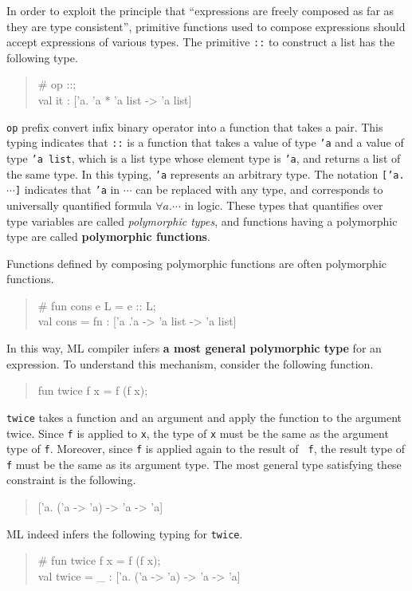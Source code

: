 \documentclass{jbook}
\newenvironment{program}{\begin{tt}\begin{quote}}{\end{quote}\end{tt}}
\begin{document}
	In order to exploit the principle that  ``expressions are freely
composed as far as they are type consistent'', primitive functions used
to compose expressions should accept expressions of various types.
	The primitive {\tt ::} to construct a list has the following type.
\begin{program}
\# op ::;\\
val it : ['a. 'a * 'a list -> 'a list]
\end{program}
	{\tt op} prefix convert infix binary operator into a function
that takes a pair.
	This typing indicates that {\tt ::} is a function that takes a
value of type {\tt 'a} and a value of type {\tt 'a list}, which is a
list type whose element type is {\tt 'a}, and returns a list of the same
type.
	In this typing, {\tt 'a} represents an arbitrary type.
	The notation {\tt ['a.$\cdots$]} indicates that {\tt 'a} in
$\cdots$ can be replaced with any type, and corresponds to universally
quantified formula $\forall a.\cdots$ in logic.
	These types that quantifies over type variables are called {\em
polymorphic types}, and functions having a polymorphic type are called 
{\bf polymorphic functions}.
	
	Functions defined by composing polymorphic functions are often
polymorphic functions.
\begin{tt}
\begin{quote}
\# fun cons  e L  = e :: L;
\\
val cons = fn : ['a .'a  ->  'a list  -> 'a list]
\end{quote}
\end{tt}
	In this way, ML compiler infers {\bf a most general polymorphic
type} for an expression.
	To understand this mechanism, consider the following function.
\begin{program}
fun twice f x = f (f x);
\end{program}
	{\tt twice} takes a function and an argument and apply the
function to the argument twice.
	Since {\tt f} is applied to {\tt x}, the type of {\tt x} must be
the same as the argument type of {\tt f}.
	Moreover, since {\tt f} is applied again to the result of {\tt
f}, the result type of {\tt f} must be the same as its argument type.
	The most general type satisfying these constraint is the following.
\begin{program}
 ['a. ('a -> 'a) -> 'a -> 'a]
\end{program}
	ML indeed infers the following typing for {\tt twice}.
\begin{tt}
\begin{quote}
\# fun twice f x = f (f x);
\\
val twice = \_ : ['a. ('a -> 'a) -> 'a -> 'a]
\end{quote}
\end{tt}
\end{document}
